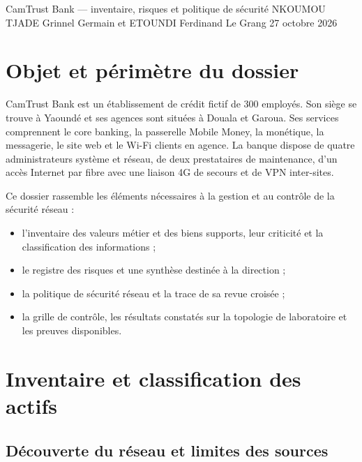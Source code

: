 \documentclass[11pt,a4paper]{article}
\begin{document}
	
	\renewcommand{\liengit}{https://github.com/nkoumougrinnel/enix-ecnsa-labs.git}
	
		{CamTrust Bank — inventaire, risques et politique de sécurité}%
		{NKOUMOU TJADE Grinnel Germain et ETOUNDI Ferdinand Le Grang}%
		{27 octobre 2026}
	
	\tableofcontents
	\newpage
	
	\section{Objet et périmètre du dossier}
	
	CamTrust Bank est un établissement de crédit fictif de 300 employés. Son siège se trouve à Yaoundé et ses agences sont situées à Douala et Garoua. Ses services comprennent le core banking, la passerelle Mobile Money, la monétique, la messagerie, le site web et le Wi-Fi clients en agence. La banque dispose de quatre administrateurs système et réseau, de deux prestataires de maintenance, d'un accès Internet par fibre avec une liaison 4G de secours et de VPN inter-sites.
	
	Ce dossier rassemble les éléments nécessaires à la gestion et au contrôle de la sécurité réseau :
	\begin{itemize}
		\item l'inventaire des valeurs métier et des biens supports, leur criticité et la classification des informations ;
		\item le registre des risques et une synthèse destinée à la direction ;
		\item la politique de sécurité réseau et la trace de sa revue croisée ;
		\item la grille de contrôle, les résultats constatés sur la topologie de laboratoire et les preuves disponibles.
	\end{itemize}
	
	\section{Inventaire et classification des actifs}
	
	\subsection{Découverte du réseau et limites des sources}
	
\end{document}
